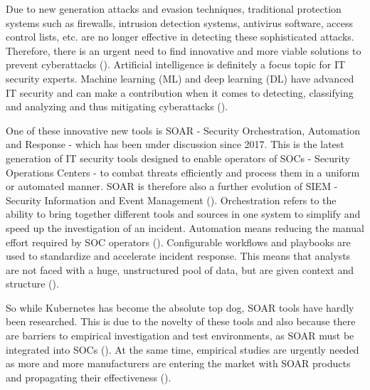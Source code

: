 Due to new generation attacks and evasion techniques, traditional protection systems such as firewalls, intrusion detection systems, antivirus software, access control lists, etc. are no longer effective in detecting these sophisticated attacks. Therefore, there is an urgent need to find innovative and more viable solutions to prevent cyberattacks (\cite{aslan_comprehensive_2023}). Artificial intelligence is definitely a focus topic for IT security experts. Machine learning (ML) and deep learning (DL) have advanced IT security and can make a contribution when it comes to detecting, classifying and analyzing and thus mitigating cyberattacks (\cite{djenna_unmasking_2023}).

One of these innovative new tools is SOAR - Security Orchestration, Automation and Response - which has been under discussion since 2017. This is the latest generation of IT security tools designed to enable operators of SOCs - Security Operations Centers - to combat threats efficiently and process them in a uniform or automated manner. SOAR is therefore also a further evolution of SIEM - Security Information and Event Management (\cite{empl_soar4iot_2022}). Orchestration refers to the ability to bring together different tools and sources in one system to simplify and speed up the investigation of an incident. Automation means reducing the manual effort required by SOC operators (\cite{katsikas_computer_2022}). Configurable workflows and playbooks are used to standardize and accelerate incident response. This means that analysts are not faced with a huge, unstructured pool of data, but are given context and structure (\cite{bridges_testing_2023}).

So while Kubernetes has become the absolute top dog, SOAR tools have hardly been researched. This is due to the novelty of these tools and also because there are barriers to empirical investigation and test environments, as SOAR must be integrated into SOCs (\cite{bridges_testing_2023}). At the same time, empirical studies are urgently needed as more and more manufacturers are entering the market with SOAR products and propagating their effectiveness (\cite{empl_soar4iot_2022}).
